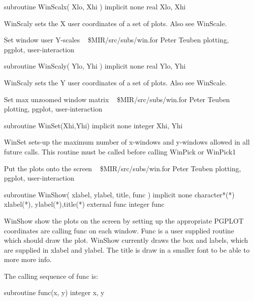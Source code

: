 \par{\tenpoint
{\eightpoint\begintt
        subroutine WinScalx( Xlo, Xhi )
        implicit none
        real Xlo, Xhi

    WinScaly sets the X user coordinates of a set of plots.  
    Also see WinScale.
\endtt}
\par}
%
\noindent Set window user Y-scales
\newline \ 
\newline {} \$MIR/src/subs/win.for
\newline {} Peter Teuben
\newline {} plotting, pgplot, user-interaction
\par{\tenpoint
{\eightpoint\begintt
        subroutine WinScaly( Ylo, Yhi )
        implicit none
        real Ylo, Yhi

    WinScaly sets the Y user coordinates of a set of plots.  
    Also see WinScale.
\endtt}
\par}
%
\noindent Set max unzoomed window matrix
\newline \ 
\newline {} \$MIR/src/subs/win.for
\newline {} Peter Teuben
\newline \abox{Keywords:} plotting, pgplot, user-interaction
\par{\tenpoint
{\eightpoint\begintt
        subroutine WinSet(Xhi,Yhi)
        implicit none
        integer Xhi, Yhi

    WinSet sets-up the maximum number of x-windows and y-windows
    allowed in all future calls. This routine must be called before
    calling WinPick or WinPick1
\endtt}
\par}
%
\noindent Put the plots onto the screen
\newline \ 
\newline {} \$MIR/src/subs/win.for
\newline \abox{Responsible:} Peter Teuben
\newline {} plotting, pgplot, user-interaction
\par{\tenpoint
{\eightpoint\begintt
        subroutine WinShow( xlabel, ylabel, title, func )
        implicit none
        character*(*) xlabel(*), ylabel(*),title(*)
        external func
        integer func

    WinShow show the plots on the screen by setting up the appropriate
    PGPLOT coordinates are calling func on each window.  Func is a user
    supplied routine which should draw the plot.  WinShow currently draws
    the box and labels, which are supplied in xlabel and ylabel.
    The title is draw in a smaller font to be able to more more info.

    The calling sequence of func is:

               subroutine func(x, y)
               integer x, y
\endtt}
\par}
